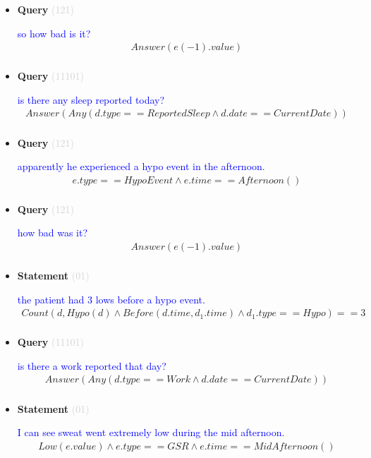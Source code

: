 \documentclass[11pt]{article}
\newcommand{\key}[1]{\textcolor{lightgray}{#1}}
\newcounter{CQuery}
\newcounter{CStatement}
\begin{document}
\begin{itemize}
\item
\textbf{Query\theCQuery} \key{(121)} \addtocounter{CQuery}{1}
\textcolor{blue}{ so how bad is it? }
\begin{multline*}
Answer(e(-1).value) \\ 
\end{multline*}


\item
\textbf{Query\theCQuery} \key{(11101)} \addtocounter{CQuery}{1}
\textcolor{blue}{ is there any sleep reported today? }
\begin{multline*}
Answer(Any(d.type==ReportedSleep \wedge d.date==CurrentDate)) \\ 
\end{multline*}


\item
\textbf{Query\theCQuery} \key{(121)} \addtocounter{CQuery}{1}
\textcolor{blue}{ apparently he experienced a hypo event in the afternoon. }
\begin{multline*}
e.type==HypoEvent \wedge e.time==Afternoon() \\ 
\end{multline*}


\item
\textbf{Query\theCQuery} \key{(121)} \addtocounter{CQuery}{1}
\textcolor{blue}{ how bad was it? }
\begin{multline*}
Answer(e(-1).value) \\ 
\end{multline*}


\item
\textbf{Statement\theCStatement} \key{(01)} \addtocounter{CStatement}{1}
\textcolor{blue}{ the patient had 3 lows before a hypo event. }
\begin{multline*}
Count(d, Hypo(d) \wedge Before(d.time, d_1.time) \wedge d_1.type==Hypo)==3 \\ 
\end{multline*}


\item
\textbf{Query\theCQuery} \key{(11101)} \addtocounter{CQuery}{1}
\textcolor{blue}{ is there a work reported that day? }
\begin{multline*}
Answer(Any(d.type==Work \wedge d.date==CurrentDate)) \\ 
\end{multline*}


\item
\textbf{Statement\theCStatement} \key{(01)} \addtocounter{CStatement}{1}
\textcolor{blue}{ I can see sweat went extremely low during the mid afternoon. }
\begin{multline*}
Low(e.value) \wedge e.type==GSR \wedge e.time==MidAfternoon() \\ 
\end{multline*}



\end{itemize}
\end{document}
